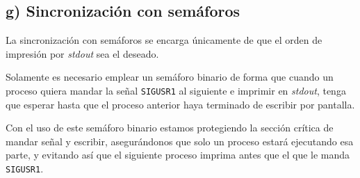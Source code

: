 \documentclass{article}
\begin{document}
\subsection*{g) Sincronización con semáforos}

La sincronización con semáforos se encarga únicamente de que el orden de impresión por \textit{stdout} sea el deseado.

Solamente es necesario emplear un semáforo binario de forma que cuando un proceso quiera mandar la señal \texttt{SIGUSR1} al siguiente e imprimir en \textit{stdout}, tenga que esperar hasta que el proceso anterior haya terminado de escribir por pantalla. 

Con el uso de este semáforo binario estamos protegiendo la sección crítica de mandar señal y escribir, asegurándonos que solo un proceso estará ejecutando esa parte, y evitando así que el siguiente proceso imprima antes que el que le manda \texttt{SIGUSR1}.
\end{document}
